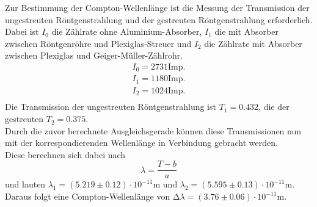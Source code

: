 Zur Bestimmung der Compton-Wellenlänge ist die Messung der Transmission
der ungestreuten Röntgenstrahlung und der gestreuten Röntgenstrahlung erforderlich.
Dabei ist $I_0$ die Zählrate ohne Aluminium-Absorber, $I_1$ die mit Absorber
zwischen Röntgenröhre und Plexiglas-Streuer und $I_2$ die Zählrate mit 
Absorber zwischen Plexiglas und Geiger-Müller-Zählrohr. \\
\begin{align*}
    I_0 = 2731 \text{Imp.}\\
    I_1 = 1180 \text{Imp.}\\
    I_2 = 1024 \text{Imp.}\\
\end{align*}
Die Transmission der ungestreuten Röntgenstrahlung ist $T_1 = 0.432$,
die der gestreuten $T_2 = 0.375$.\\
Durch die zuvor berechnete Ausgleichsgerade können diese Transmissionen nun
mit der korrespondierenden Wellenlänge in Verbindung gebracht werden.\\
Diese berechnen sich dabei nach
\begin{equation}
    \lambda = \frac{T - b}{a}
\end{equation}
und lauten $\lambda_1 = \left(5.219 \pm 0.12 \right) \cdot 10^{-11} \si{\m}$ und $\lambda_2 = \left(5.595 \pm 0.13 \right) \cdot 10^{-11} \si{\m}$.\\
Daraus folgt eine Compton-Wellenlänge von $\increment \lambda = \left(3.76 \pm 0.06 \right) \cdot 10^{-11} \si{\m}$.